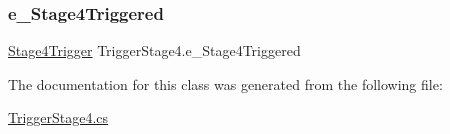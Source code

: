 \subsubsection{\texorpdfstring{e\+\_\+\+Stage4\+Triggered}{e\_Stage4Triggered}}
{\footnotesize\ttfamily \mbox{\hyperlink{class_trigger_stage4_a9b09ff6aa89d24158570596dc578bc0a}{Stage4\+Trigger}} Trigger\+Stage4.\+e\+\_\+\+Stage4\+Triggered\hspace{0.3cm}{\ttfamily [static]}}



The documentation for this class was generated from the following file\+:\begin{DoxyCompactItemize}
\item 
\mbox{\hyperlink{_trigger_stage4_8cs}{Trigger\+Stage4.\+cs}}\end{DoxyCompactItemize}
